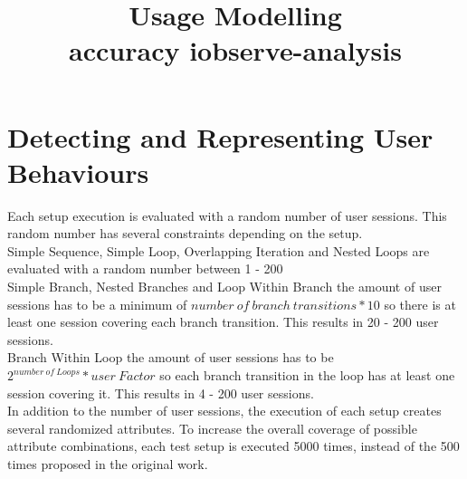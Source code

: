 \documentclass[10pt,a4paper]{article}
\begin{document}
\title{Usage Modelling\\accuracy iobserve-analysis}
\date{}
\maketitle

\section{Detecting and Representing User Behaviours}
Each setup execution is evaluated with a random number of user sessions. This random number has several constraints depending on the setup.\\
Simple Sequence, Simple Loop, Overlapping Iteration and Nested Loops are evaluated with a random number between 1 - 200 \\
Simple Branch, Nested Branches and Loop Within Branch the amount of user sessions has to be a minimum of $number\ of\ branch\ transitions * 10$ so there is at least one session covering each branch transition. This results in 20 - 200 user sessions. \\
Branch Within Loop the amount of user sessions has to be $2^{number\ of\ Loops} * user\ Factor$ so each branch transition in the loop has at least one session covering it. This results in 4 - 200 user sessions. \\

In addition to the number of user sessions, the execution of each setup creates several randomized attributes. To increase the overall coverage of possible attribute combinations, each test setup is executed 5000 times, instead of the 500 times proposed in the original work.
\end{document}
